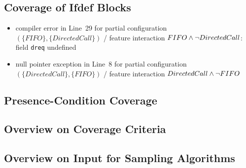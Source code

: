 \subsection{Coverage of Ifdef Blocks}
\begin{frame}{\insertsubsection}
			\begin{itemize}
				\item compiler error in Line~29 for partial configuration $(\{FIFO\},\{DirectedCall\})$ / feature interaction $FIFO \wedge \neg DirectedCall$: field \texttt{dreq} undefined
				\item null pointer exception in Line~8 for partial configuration $(\{DirectedCall\},\{FIFO\})$ / feature interaction $DirectedCall \wedge \neg FIFO$
			\end{itemize}
\end{frame}

\subsection{Presence-Condition Coverage}


\subsection{Overview on Coverage Criteria}
\begin{frame}{\insertsubsection}
\end{frame}

\subsection{Overview on Input for Sampling Algorithms}
\begin{frame}{\insertsubsection}
\end{frame}

